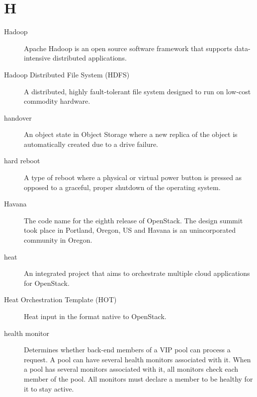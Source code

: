 \documentclass[letterpaper,10pt,english]{sphinxmanual}
\begin{document}
\section{H}
\label{_source/glossary:h}\begin{description}
\item[{Hadoop}] \leavevmode{}\label{_source/glossary:term-hadoop}
Apache Hadoop is an open source software framework that supports
data-intensive distributed applications.

\item[{Hadoop Distributed File System (HDFS)}] \leavevmode{}\label{_source/glossary:term-hadoop-distributed-file-system-hdfs}
A distributed, highly fault-tolerant file system designed to run
on low-cost commodity hardware.

\item[{handover}] \leavevmode{}\label{_source/glossary:term-handover}
An object state in Object Storage where a new replica of the
object is automatically created due to a drive failure.

\item[{hard reboot}] \leavevmode{}\label{_source/glossary:term-hard-reboot}
A type of reboot where a physical or virtual power button is
pressed as opposed to a graceful, proper shutdown of the operating
system.

\item[{Havana}] \leavevmode{}\label{_source/glossary:term-havana}
The code name for the eighth release of OpenStack. The
design summit took place in Portland, Oregon, US and Havana is
an unincorporated community in Oregon.

\item[{heat}] \leavevmode{}\label{_source/glossary:term-heat}
An integrated project that aims to orchestrate multiple cloud
applications for OpenStack.

\item[{Heat Orchestration Template (HOT)}] \leavevmode{}\label{_source/glossary:term-heat-orchestration-template-hot}
Heat input in the format native to OpenStack.

\item[{health monitor}] \leavevmode{}\label{_source/glossary:term-health-monitor}
Determines whether back-end members of a VIP pool can
process a request. A pool can have several health monitors
associated with it. When a pool has several monitors
associated with it, all monitors check each member of the
pool. All monitors must declare a member to be healthy for
it to stay active.


\end{description}
\end{document}
